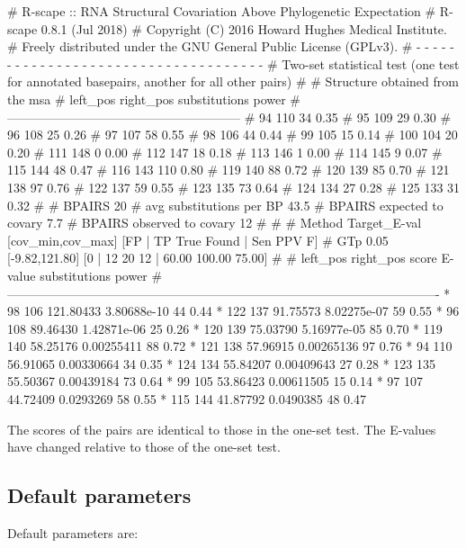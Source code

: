 \begin{sreoutput}
# R-scape :: RNA Structural Covariation Above Phylogenetic Expectation
# R-scape 0.8.1 (Jul 2018)
# Copyright (C) 2016 Howard Hughes Medical Institute.
# Freely distributed under the GNU General Public License (GPLv3).
# - - - - - - - - - - - - - - - - - - - - - - - - - - - - - - - - - - - -
# Two-set statistical test (one test for annotated basepairs, another for all other pairs)
#
# Structure obtained from the msa
# left_pos      right_pos    substitutions      power
#--------------------------------------------------------
# 94		110		34		0.35
# 95		109		29		0.30
# 96		108		25		0.26
# 97		107		58		0.55
# 98		106		44		0.44
# 99		105		15		0.14
# 100		104		20		0.20
# 111		148		0		0.00
# 112		147		18		0.18
# 113		146		1		0.00
# 114		145		9		0.07
# 115		144		48		0.47
# 116		143		110		0.80
# 119		140		88		0.72
# 120		139		85		0.70
# 121		138		97		0.76
# 122		137		59		0.55
# 123		135		73		0.64
# 124		134		27		0.28
# 125		133		31		0.32
#
# BPAIRS 20
# avg substitutions per BP  43.5
# BPAIRS expected to covary 7.7
# BPAIRS observed to covary 12
#
#
# Method Target_E-val [cov_min,cov_max] [FP | TP True Found | Sen PPV F] 
# GTp    0.05         [-9.82,121.80]     [0 | 12 20 12 | 60.00 100.00 75.00] 
#
#       left_pos       right_pos        score          E-value       substitutions      power
#-------------------------------------------------------------------------------------------------------
*	      98	     106	121.80433	3.80688e-10	44		0.44
*	     122	     137	91.75573	8.02275e-07	59		0.55
*	      96	     108	89.46430	1.42871e-06	25		0.26
*	     120	     139	75.03790	5.16977e-05	85		0.70
*	     119	     140	58.25176	0.00255411	88		0.72
*	     121	     138	57.96915	0.00265136	97		0.76
*	      94	     110	56.91065	0.00330664	34		0.35
*	     124	     134	55.84207	0.00409643	27		0.28
*	     123	     135	55.50367	0.00439184	73		0.64
*	      99	     105	53.86423	0.00611505	15		0.14
*	      97	     107	44.72409	0.0293269	58		0.55
*	     115	     144	41.87792	0.0490385	48		0.47
\end{sreoutput}
The scores of the pairs are identical to those in the one-set
test. The E-values have changed relative to those of the one-set test.

\subsection{Default parameters}

Default parameters are:

